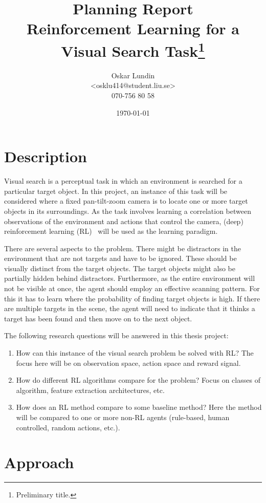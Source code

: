 \documentclass{article}
\title{Planning Report \\ \large Reinforcement Learning for a Visual Search Task\footnote{Preliminary title.}}
\author{Oskar Lundin\\<osklu414@student.liu.se>\\070-756 80 58}
\date{\today}
\begin{document}
\maketitle

\section{Description}

Visual search is a perceptual task in which an environment is searched for a particular target object. In this project, an instance of this task will be considered where a fixed pan-tilt-zoom camera is to locate one or more target objects in its surroundings. As the task involves learning a correlation between observations of the environment and actions that control the camera, (deep) reinforcement learning (RL)~\cite{sutton2018} will be used as the learning paradigm.

There are several aspects to the problem. There might be distractors in the environment that are not targets and have to be ignored. These should be visually distinct from the target objects. The target objects might also be partially hidden behind distractors. Furthermore, as the entire environment will not be visible at once, the agent should employ an effective scanning pattern. For this it has to learn where the probability of finding target objects is high. If there are multiple targets in the scene, the agent will need to indicate that it thinks a target has been found and then move on to the next object.

\noindent
The following research questions will be answered in this thesis project:

\begin{enumerate}
    \item How can this instance of the visual search problem be solved with RL? The focus here will be on observation space, action space and reward signal.
    \item How do different RL algorithms compare for the problem? Focus on classes of algorithm, feature extraction architectures, etc. 
    \item How does an RL method compare to some baseline method? Here the method will be compared to one or more non-RL agents (rule-based, human controlled, random actions, etc.).
\end{enumerate}

\section{Approach}
\end{document}
